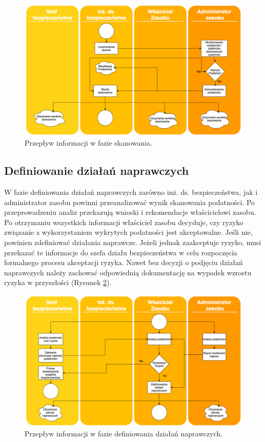 \begin{figure}[!ht]
\centering
\includegraphics[width=.9\textwidth]{Chapters/Wstep/p-vm/scaninng.png}
\caption{Przepływ informacji w fazie skanowania.}
\label{fig:vm-scanning}
\end{figure}
\FloatBarrier

\subsection{Definiowanie działań naprawczych}
W fazie definiowania działań naprawczych zarówno inż. ds. bezpieczeństwa, jak i administrator zasobu powinni przeanalizować wynik skanowania podatności. Po przeprowadzeniu analiz przekazują wnioski i rekomendacje właścicielowi zasobu. Po otrzymaniu wszystkich informacji właściciel zasobu decyduje, czy ryzyko związanie z wykorzystaniem wykrytych podatności jest akceptowalne. Jeśli nie, powinien zdefiniować działania naprawcze. Jeżeli jednak zaakceptuje ryzyko, musi przekazać te informacje do szefa działu bezpieczeństwa w celu rozpoczęcia formalnego procesu akceptacji ryzyka. Nawet bez decyzji o podjęciu działań naprawczych należy zachować odpowiednią dokumentację na wypadek wzrostu ryzyka w przyszłości (Rysunek \ref{fig:vm-fixing}).

\begin{figure}[!ht]
\centering
\includegraphics[width=.9\textwidth]{Chapters/Wstep/p-vm/vm-fixing.png}
\caption{Przepływ informacji w fazie definiowania działań naprawczych.}
\label{fig:vm-fixing}
\end{figure}

